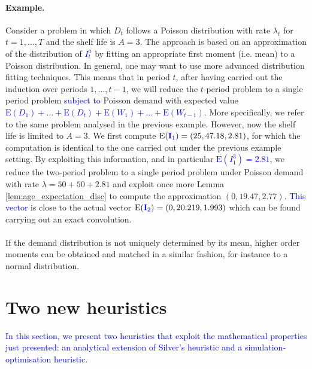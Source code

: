 \documentclass{tPRS2e}
\newcommand{\blue}{\textcolor{blue}}
\begin{document}
	\paragraph*{\bf Example.} Consider a problem in which $D_t$ follows a Poisson distribution with rate $\lambda_t$ for $t=1,\ldots,T$ and the shelf life is $A=3$. The approach is based on an approximation of the distribution of \blue{$I^a_{t}$} by fitting an appropriate first moment (i.e. mean) to a Poisson distribution. In general, one may want to use more advanced distribution fitting techniques. This means that in period $t$, after having carried out the induction over periods $1,\ldots,t-1$, we will reduce the $t$-period problem to a single period problem \blue{subject to} Poisson demand with expected value \blue{$\mathrm{E}(D_1)+\ldots+\mathrm{E}(D_t)+\mathrm{E}(W_{1})+\ldots+\mathrm{E}(W_{t-1})$.} More specifically, we refer to the same problem analysed in the previous example. However, now the shelf life is limited to $A=3$. We first compute $\mathrm{E}(\blue{\mathbf{I}_1})=(25, 47.18, 2.81)$, for which the computation is identical to the one carried out under the previous example setting. By exploiting this information, and in particular \blue{$\mathrm{E}(I^3_{1})=2.81$}, we reduce the two-period problem to a single period problem under Poisson demand with rate $\lambda=50+50+2.81$ and exploit once more Lemma  \ref{lem:age_expectation_disc} to compute the approximation $(0, 19.47, 2.77)$\blue{. This vector} is close to the actual vector $\mathrm{E}(\blue{\mathbf{I}_2})=(0, 20.219, 1.993)$ which can be found carrying out an exact convolution.
	
	\paragraph*{}
	If the demand distribution is not uniquely determined by its mean, higher order moments can be obtained and matched in a similar fashion, for instance to a normal distribution.
	
	
	\section{Two new heuristics}
	\label{sec:silversanalytic}
%	
\blue{In this section, we present two heuristics that exploit the mathematical properties just presented: an analytical extension of Silver's heuristic and a simulation-optimisation heuristic}.
\end{document}
